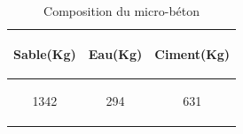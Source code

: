 \documentclass[12pt]{report}
\begin{document}
\begin{table}[h]
\begin{center}
\begin{tabular}{ccc}
\hline
\begin{bf}                   Sable(Kg)         \end{bf} & \begin{bf}                   Eau(Kg)         \end{bf} & \begin{bf}                   Ciment(Kg)           \end{bf} \\
\hline 
\begin{bf}\rowcolor{cyan}1342\end{bf} & \begin{bf}294\end{bf} & \begin{bf}631\end{bf} \\
\hline 
\end{tabular}
\end{center}
\caption{Composition du micro-béton}
\label{micro-béton}
\end{table}
\end{document}
